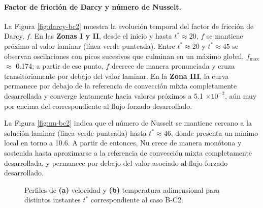\paragraph{Factor de fricción de Darcy y número de Nusselt.}
La Figura \ref{fig:darcy-bc2} muestra la evolución temporal del factor de fricción de Darcy, $f$. En las \textbf{Zonas I y II}, desde el inicio y hasta $t^* \approx 20$, $f$ se mantiene próximo al valor laminar (línea verde punteada). Entre $t^* \approx 20$ y $t^* \approx 45$ se observan oscilaciones con picos sucesivos que culminan en un máximo global, $f_{\max}$ $\approx$ 0.174; a partir de ese punto, $f$ decrece de manera pronunciada y cruza transitoriamente por debajo del valor laminar. En la \textbf{Zona III}, la curva permanece por debajo de la referencia de convección mixta completamente desarrollada y converge lentamente hacia valores próximos a 5.1 $\times 10^{-2}$, aún muy por encima del correspondiente al flujo forzado desarrollado.

La Figura \ref{fig:nu-bc2} indica que el número de Nusselt se mantiene cercano a la solución laminar (línea verde punteada) hasta $t^* \approx 46$, donde presenta un mínimo local en torno a 10.6. A partir de entonces, $\mathrm{Nu}$ crece de manera monótona y sostenida hasta aproximarse a la referencia de convección mixta completamente desarrollada, y permanece por debajo del valor asociado al flujo forzado desarrollado.


\begin{figure}[H]
  \centering  
  \caption{Perfiles de \textbf{(a)} velocidad y \textbf{(b)} temperatura adimensional para distintos instantes $t^*$ correspondiente al caso B-C2.}
  \label{fig:bc2-1}
\end{figure}

